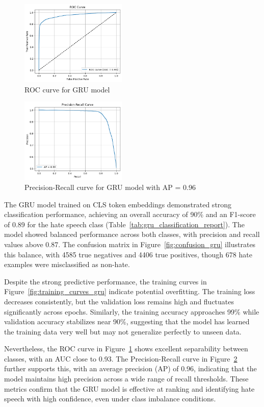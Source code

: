 \begin{figure}[H]
    \centering
    \includegraphics[width=0.45\textwidth]{images/roc_curve_gru.png}
    \caption{ROC curve for GRU model}
    \label{fig:roc_gru}
\end{figure}

\begin{figure}[H]
    \centering
    \includegraphics[width=0.45\textwidth]{images/precision_recall_gru.png}
    \caption{Precision-Recall curve for GRU model with AP = 0.96}
    \label{fig:pr_gru}
\end{figure}

The GRU model trained on CLS token embeddings demonstrated strong classification performance, achieving an overall accuracy of 90\% and an F1-score of 0.89 for the hate speech class (Table~\ref{tab:gru_classification_report}). The model showed balanced performance across both classes, with precision and recall values above 0.87. The confusion matrix in Figure~\ref{fig:confusion_gru} illustrates this balance, with 4585 true negatives and 4406 true positives, though 678 hate examples were misclassified as non-hate.

Despite the strong predictive performance, the training curves in Figure~\ref{fig:training_curves_gru} indicate potential overfitting. The training loss decreases consistently, but the validation loss remains high and fluctuates significantly across epochs. Similarly, the training accuracy approaches 99\% while validation accuracy stabilizes near 90\%, suggesting that the model has learned the training data very well but may not generalize perfectly to unseen data.

Nevertheless, the ROC curve in Figure~\ref{fig:roc_gru} shows excellent separability between classes, with an AUC close to 0.93. The Precision-Recall curve in Figure~\ref{fig:pr_gru} further supports this, with an average precision (AP) of 0.96, indicating that the model maintains high precision across a wide range of recall thresholds. These metrics confirm that the GRU model is effective at ranking and identifying hate speech with high confidence, even under class imbalance conditions.
